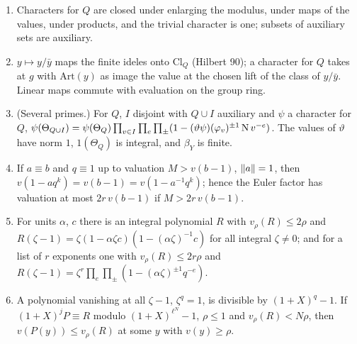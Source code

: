 \begin{lemma}\label{lem:stickelberger-basics}
\begin{enumerate}[label=\textup{(\alph*)}]
\item Characters for $Q$ are closed under enlarging the modulus, under maps of the values, under products, and the trivial character is one; subsets of auxiliary sets are auxiliary.
\item $y\mapsto y/\bar y$ maps the finite ideles onto $\mathrm{Cl}_Q$ (Hilbert 90); a character for $Q$ takes at $g$ with $\mathrm{Art}(y)$ as image the value at the chosen lift of the class of $y/\bar y$. Linear maps commute with evaluation on the group ring.
\item (Several primes.) For $Q$, $I$ disjoint with $Q\cup I$ auxiliary and $\psi$ a character for $Q$, $\psi(\Theta_{Q\cup I})=\psi(\Theta_Q)\prod_{v\in I}\prod_e\prod_\pm(1-(\vartheta\psi)(\varphi_v)^{\pm1}\operatorname{N} v^{-e})$. The values of $\vartheta$ have norm $1$, $1(\Theta_Q)$ is integral, and $\beta_Y$ is finite.
\item If $a\equiv b$ and $q\equiv1$ up to valuation $M>v(b-1)$, $\lVert a\rVert=1$, then $v(1-aq^k)=v(b-1)=v(1-a^{-1}q^k)$; hence the Euler factor has valuation at most $2r\,v(b-1)$ if $M>2r\,v(b-1)$.
\item For units $\alpha$, $c$ there is an integral polynomial $R$ with $v_\rho(R)\le2\rho$ and $R(\zeta-1)=\zeta(1-\alpha\zeta c)(1-(\alpha\zeta)^{-1}c)$ for all integral $\zeta\ne0$; and for a list of $r$ exponents one with $v_\rho(R)\le2r\rho$ and $R(\zeta-1)=\zeta^r\prod_e\prod_\pm(1-(\alpha\zeta)^{\pm1}q^{-e})$.
\item A polynomial vanishing at all $\zeta-1$, $\zeta^q=1$, is divisible by $(1+X)^q-1$. If $(1+X)^jP\equiv R$ modulo $(1+X)^{\ell^N}-1$, $\rho\le1$ and $v_\rho(R)<N\rho$, then $v(P(y))\le v_\rho(R)$ at some $y$ with $v(y)\ge\rho$.
\end{enumerate}
\end{lemma}

